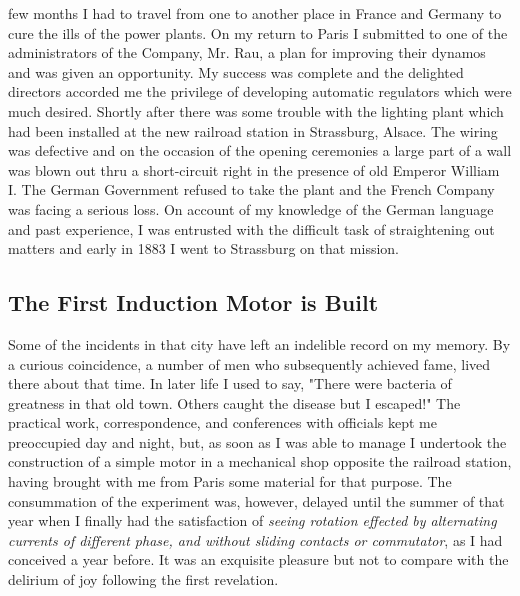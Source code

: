 \documentclass[a4paper,12pt,english,twoside,openright]{memoir}
\begin{document}
 few months I had to travel from one to another 
place in France and Germany to cure the ills of the power plants.  On my return to Paris I 
submitted to one of the administrators of the Company, Mr. Rau, a plan for improving their 
dynamos and was given an opportunity.  My success was complete and the delighted directors accorded me the privilege of developing automatic regulators which were much desired.  Shortly 
after there was some trouble with the lighting plant which had been installed at the new railroad 
station in Strassburg, Alsace.  The wiring was defective and on the occasion of the opening 
ceremonies a large part of a wall was blown out thru a short-circuit right in the presence of old 
Emperor William I.  The German Government refused to take the plant and the French Company 
was facing a serious loss.  On account of my knowledge of the German language and past 
experience, I was entrusted with the difficult task of straightening out matters and early in 1883 I 
went to Strassburg on that mission.  

\vspace{-1em}
\subsection{The First Induction Motor is Built}

Some of the incidents in that city have left an indelible record on my memory.  By a curious 
coincidence, a number of men who subsequently achieved fame, lived there about that time.  In 
later life I used to say, "There were bacteria of greatness in that old town.  Others caught the 
disease but I escaped!" The practical work, correspondence, and conferences with officials kept 
me preoccupied day and night, but, as soon as I was able to manage I undertook the construction 
of a simple motor in a mechanical shop opposite the railroad station, having brought with me from 
Paris some material for that purpose.  The consummation of the experiment was, however, 
delayed until the summer of that year when I finally had the satisfaction of \emph{seeing rotation effected 
by alternating currents of different phase, and without sliding contacts or commutator}, as I had 
conceived a year before.  It was an exquisite pleasure but not to compare with the delirium of joy 
following the first revelation.  
\end{document}
